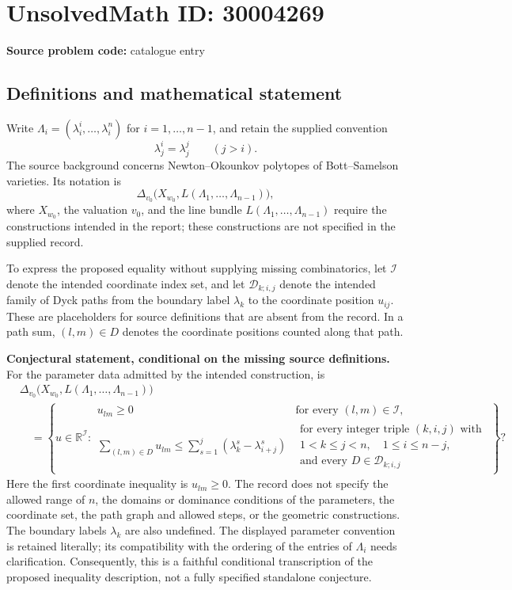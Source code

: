 \documentclass[11pt]{article}
\begin{document}
\section*{UnsolvedMath ID: 30004269}
\textbf{Source problem code:} catalogue entry
\subsection{Definitions and mathematical statement}
Write \(\Lambda_i=(\lambda_i^i,\ldots,\lambda_i^n)\) for \(i=1,\ldots,n-1\), and retain the supplied convention
\[
\lambda_j^i=\lambda_j^j\qquad(j>i).
\]
The source background concerns Newton--Okounkov polytopes of Bott--Samelson varieties. Its notation is
\[
\Delta_{v_0}\bigl(X_{w_0},L(\Lambda_1,\ldots,\Lambda_{n-1})\bigr),
\]
where \(X_{w_0}\), the valuation \(v_0\), and the line bundle \(L(\Lambda_1,\ldots,\Lambda_{n-1})\) require the constructions intended in the report; these constructions are not specified in the supplied record.

To express the proposed equality without supplying missing combinatorics, let \(\mathcal I\) denote the intended coordinate index set, and let \(\mathcal D_{k;i,j}\) denote the intended family of Dyck paths from the boundary label \(\lambda_k\) to the coordinate position \(u_{ij}\). These are placeholders for source definitions that are absent from the record. In a path sum, \((l,m)\in D\) denotes the coordinate positions counted along that path.

\textbf{Conjectural statement, conditional on the missing source definitions.} For the parameter data admitted by the intended construction, is
\[
\begin{aligned}
&\Delta_{v_0}\bigl(X_{w_0},L(\Lambda_1,\ldots,\Lambda_{n-1})\bigr)\\
&\quad=\left\{u\in\mathbb R^{\mathcal I}:\begin{array}{ll}
u_{lm}\geq0&\text{for every }(l,m)\in\mathcal I,\\[2pt]
\displaystyle\sum_{(l,m)\in D}u_{lm}\leq
\displaystyle\sum_{s=1}^{j}(\lambda_k^s-\lambda_{i+j}^s)
&\begin{gathered}
\text{for every integer triple }(k,i,j)\text{ with}\\
1<k\leq j<n,\quad 1\leq i\leq n-j,\\
\text{and every }D\in\mathcal D_{k;i,j}
\end{gathered}
\end{array}\right\}?
\end{aligned}
\]
Here the first coordinate inequality is \(u_{lm}\geq0\). The record does not specify the allowed range of \(n\), the domains or dominance conditions of the parameters, the coordinate set, the path graph and allowed steps, or the geometric constructions. The boundary labels \(\lambda_k\) are also undefined. The displayed parameter convention is retained literally; its compatibility with the ordering of the entries of \(\Lambda_i\) needs clarification. Consequently, this is a faithful conditional transcription of the proposed inequality description, not a fully specified standalone conjecture.
\end{document}
